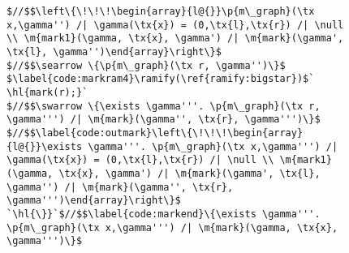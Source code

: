 \begin{figure}[t]
\begin{lstlisting}[multicols=2]
$//$$\left\{\!\!\!\begin{array}{l@{}}\p{m\_graph}(\tx x,\gamma'') /| \gamma(\tx{x}) = (0,\tx{l},\tx{r}) /| \null \\ \m{mark1}(\gamma, \tx{x}, \gamma') /| \m{mark}(\gamma', \tx{l}, \gamma'')\end{array}\right\}$
$//$$\searrow \{\p{m\_graph}(\tx r, \gamma'')\}$
$\label{code:markram4}\ramify(\ref{ramify:bigstar})$` \hl{mark(r);}`
$//$$\swarrow \{\exists \gamma'''. \p{m\_graph}(\tx r, \gamma''') /| \m{mark}(\gamma'', \tx{r}, \gamma''')\}$
$//$$\label{code:outmark}\left\{\!\!\!\begin{array}{l@{}}\exists \gamma'''. \p{m\_graph}(\tx x,\gamma''') /| \gamma(\tx{x}) = (0,\tx{l},\tx{r}) /| \null \\ \m{mark1}(\gamma, \tx{x}, \gamma') /| \m{mark}(\gamma', \tx{l}, \gamma'') /| \m{mark}(\gamma'', \tx{r}, \gamma''')\end{array}\right\}$
`\hl{\}}`$//$$\label{code:markend}\{\exists \gamma'''. \p{m\_graph}(\tx x,\gamma''') /| \m{mark}(\gamma, \tx{x}, \gamma''')\}$
\end{lstlisting}



\end{figure}
